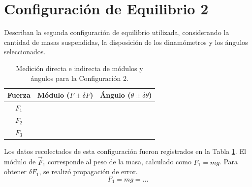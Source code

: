 \section{Configuración de Equilibrio 2}Describan la segunda configuración de equilibrio utilizada, considerando la cantidad de masas suspendidas, la disposición de los dinamómetros y los ángulos seleccionados.\begin{table}[h!]
\centering
\begin{tabular}{|c|c|c|}
\hline
\textbf{Fuerza} & \textbf{Módulo ($F \pm \delta F$)} & \textbf{Ángulo ($\theta \pm \delta \theta$)} \\ \hline
$F_1$ & & \\ \hline
$F_2$ & & \\ \hline
$F_3$ & & \\ \hline
\end{tabular}
\caption{Medición directa e indirecta de módulos y ángulos para la Configuración 2.}
\label{tab:config2-mediciones}
\end{table}Los datos recolectados de esta configuración fueron registrados en la Tabla \ref{tab:config2-mediciones}. El módulo de $\vec{F}_1$ corresponde al peso de la masa, calculado como $F_1 = mg$. Para obtener $\delta F_1$, se realizó propagación de error.\begin{equation*}
F_1 = mg = \dots
\end{equation*}
